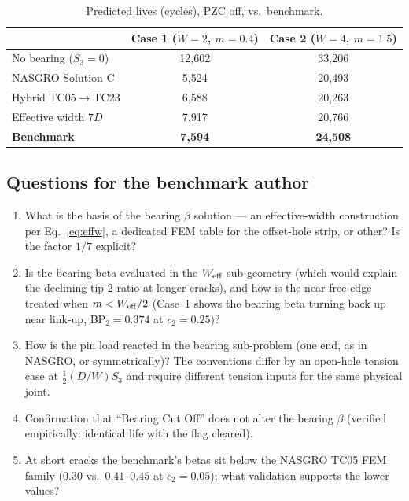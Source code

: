 \documentclass[11pt]{article}
\begin{document}
\begin{table}[h]
\centering
\caption{Predicted lives (cycles), PZC off, vs.\ benchmark.}
\label{tab:lives}
\begin{tabular}{lcc}
\toprule
 & Case 1 ($W{=}2$, $m{=}0.4$) & Case 2 ($W{=}4$, $m{=}1.5$)\\
\midrule
No bearing ($S_3=0$)        & 12{,}602 & 33{,}206\\
NASGRO Solution C           &  5{,}524 & 20{,}493\\
Hybrid TC05$\to$TC23        &  6{,}588 & 20{,}263\\
Effective width $7D$        &  7{,}917 & 20{,}766\\
\textbf{Benchmark}          &  \textbf{7{,}594} & \textbf{24{,}508}\\
\bottomrule
\end{tabular}
\end{table}

\subsection{Questions for the benchmark author}

\begin{enumerate}
\item What is the basis of the bearing $\beta$ solution --- an effective-width
  construction per Eq.~\eqref{eq:effw}, a dedicated FEM table for the
  offset-hole strip, or other? Is the factor $1/7$ explicit?
\item Is the bearing beta evaluated in the $W_{\rm eff}$ sub-geometry (which
  would explain the declining tip-2 ratio at longer cracks), and how is the
  near free edge treated when $m<W_{\rm eff}/2$ (Case~1 shows the bearing
  beta turning back up near link-up, BP$_2=0.374$ at $c_2=0.25$)?
\item How is the pin load reacted in the bearing sub-problem (one end, as in
  NASGRO, or symmetrically)? The conventions differ by an open-hole tension
  case at $\tfrac12(D/W)S_3$ and require different tension inputs for the
  same physical joint.
\item Confirmation that ``Bearing Cut Off'' does not alter the bearing
  $\beta$ (verified empirically: identical life with the flag cleared).
\item At short cracks the benchmark's betas sit below the NASGRO TC05 FEM
  family ($0.30$ vs.\ $0.41$--$0.45$ at $c_2=0.05$); what validation
  supports the lower values?
\end{enumerate}
\end{document}
